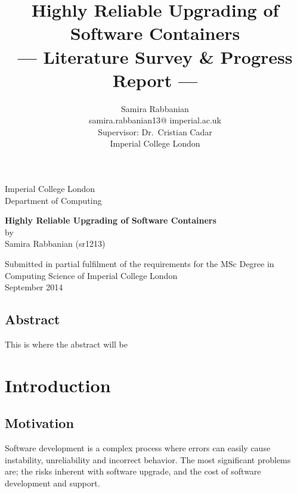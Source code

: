 \documentclass[a4paper,11pt,twoside]{report}
\title{Highly Reliable Upgrading of Software Containers\\\Large{--- Literature Survey \& Progress Report ---}}
\author{Samira Rabbanian\\
  samira.rabbanian13@ imperial.ac.uk \\
  \small{Supervisor: Dr.\ Cristian Cadar}\\
  \small{Imperial College London}}
\newcommand\blankpage{%
\null
\thispagestyle{empty}%
\addtocounter{page}{-1}%
\newpage}
\begin{document}
\maketitle

\begin{titlepage}
    \begin{center}
        \vspace*{2cm}
        
        \large
        {\Large Imperial College London}\\
        \large
         \vspace*{0.2cm}
        {\Large Department of Computing}
        
        \vspace{4.5 cm}
        \large
        {\huge \textbf{Highly Reliable Upgrading of Software Containers}}\\
        \vspace{1.0 cm}
        {\Large by}\\
        {\Large Samira Rabbanian (sr1213)}
        
        \vspace{10cm}
        

  	\large {\Large Submitted in partial fulfilment of the requirements for the MSc Degree in Computing Science of Imperial College London }\\
  	
\vspace*{1 cm}  	
  \large{\Large September 2014}\\ 
           
    \end{center}
\end{titlepage}
\afterpage{\blankpage}
\clearpage

\section*{Abstract}
This is where the abstract will be 
\clearpage


\tableofcontents
\clearpage

\listoffigures
\clearpage

\chapter{Introduction}
\section{Motivation}
Software development is a complex process where errors can easily cause instability, unreliability and incorrect behavior. The most significant problems are; the risks inherent with software upgrade, and the cost of software development and support. 
 
\end{document}

